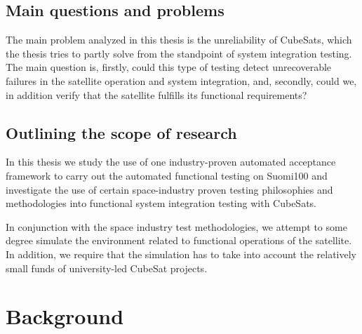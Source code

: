 \documentclass[english,12pt,a4paper,pdftex,elec,utf8]{aaltothesis}
\begin{document}
\subsection{Main questions and problems}
The main problem analyzed in this thesis is the unreliability of CubeSats, which the thesis tries to partly solve from the standpoint of system integration testing. The main question is, firstly, could this type of testing detect unrecoverable failures in the satellite operation and system integration, and, secondly, could we, in addition verify that the satellite fulfills its functional requirements?
\subsection{Outlining the scope of research}
In this thesis we study the use of one industry-proven automated acceptance framework to carry out the automated functional testing on Suomi100 and investigate the use of certain space-industry proven testing philosophies and methodologies into functional system integration testing with CubeSats.\par
In conjunction with the space industry test methodologies, we attempt to some degree simulate the environment related to functional operations of the satellite. In addition, we require that the simulation has to take into account the relatively small funds of university-led CubeSat projects.\par




\clearpage

\section{Background}
\end{document}
